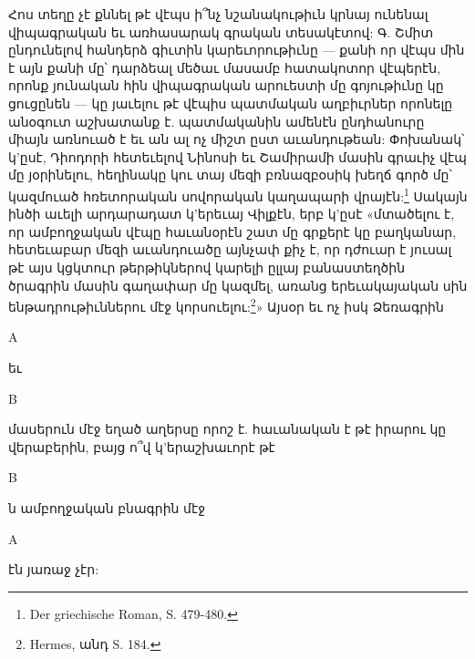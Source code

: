 \documentclass{article}
\begin{document}
{Հոս տեղը չէ քննել թէ վէպս ի՞նչ նշանակութիւն կրնայ ունենալ վիպագրական եւ առհասարակ գրական տեսակէտով: Գ. Շմիտ ընդունելով հանդերձ գիւտին կարեւորութիւնը — քանի որ վէպս մին է այն քանի մը՝ դարձեալ մեծաւ մասամբ հատակոտոր վէպերէն, որոնք յունական հին վիպագրական արուեստի մը գոյութիւնը կը ցուցընեն — կը յաւելու թէ վէպիս պատմական աղբիւրներ որոնելը անօգուտ աշխատանք է. պատմականին ամենէն ընդհանուրը միայն առնուած է եւ ան ալ ոչ միշտ ըստ աւանդութեան: Փոխանակ՝ կ'ըսէ, Դիոդորի հետեւելով Նինոսի եւ Շամիրամի մասին գրաւիչ վէպ մը յօրինելու, հեղինակը կու տայ մեզի բռնազբօսիկ խեղճ գործ մը՝ կազմուած հռետորական սովորական կաղապարի վրայէն:\footnote{Der griechische Roman, S. 479-480.} Սակայն ինծի աւելի արդարադատ կ'երեւայ Վիլքէն, երբ կ'ըսէ «մտածելու է, որ ամբողջական վէպը հաւանօրէն շատ մը գրքերէ կը բաղկանար, հետեւաբար մեզի աւանդուածը այնչափ քիչ է, որ դժուար է յուսալ թէ այս կցկտուր թերթիկներով կարելի ըլլայ բանաստեղծին ծրագրին մասին գաղափար մը կազմել, առանց երեւակայական սին ենթադրութիւններու մէջ կորսուելու:\footnote{Hermes, անդ S. 184.}» Այսօր եւ ոչ իսկ Ձեռագրին \begin{greek}Α\end{greek} եւ \begin{greek}Β\end{greek} մասերուն մէջ եղած աղերսը որոշ է. հաւանական է թէ իրարու կը վերաբերին, բայց ո՞վ կ'երաշխաւորէ թէ \begin{greek}Β\end{greek}ն ամբողջական բնագրին մէջ \begin{greek}Α\end{greek}էն յառաջ չէր:

}
\end{document}
